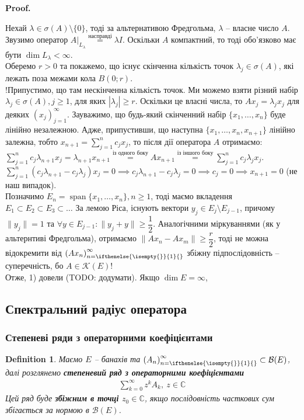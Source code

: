\documentclass[a4paper, 10pt]{article}
\makeatletter
\theoremstyle{theoremdd}
\theoremstyle{theoremdd}
\newtheorem{definition}[theorem]{Definition}
\theoremstyle{theoremdd}
\theoremstyle{theoremdd}
\theoremstyle{theoremdd}
\theoremstyle{theoremdd}
\theoremstyle{theoremdd}
\theoremstyle{theoremdd}
\newcommand{\sequence}[2][]{\left({#2}\right)_{n=\ifthenelse{\isempty{#1}}{1}{#1}}^{\infty}}
\renewenvironment{proof}[1][Proof.\\]{\par
\pushQED{\hfill \qed}%
\normalfont \topsep6\p@\@plus6\p@\relax
\trivlist
\item\relax
{\bfseries
#1\@addpunct{.}}\hspace\labelsep\ignorespaces
}{%
\popQED\endtrivlist\@endpefalse
}
\DeclareMathOperator{\linspan}{span}
\makeatother
\begin{document}
\begin{proof}
Нехай $\lambda \in \sigma(A) \setminus \{0\}$, тоді за альтернативою Фредгольма, $\lambda$ -- власне число $A$. Звузимо оператор $A|_{L_\lambda} \overset{\text{насправді}}{=} \lambda I$. Оскільки $A$ компактний, то тоді обо'язково має бути $\dim L_\lambda < \infty$.
\bigskip \\
Оберемо $r > 0$ та покажемо, що існує скінченна кількість точок $\lambda_j \in \sigma(A)$, які лежать поза межами кола $B(0;r)$.\\
!Припустимо, що там нескінченна кількість точок. Ми можемо взяти різний набір $\lambda_j \in \sigma(A), j \geq 1$, для яких $|\lambda_j| \geq r$. Оскільки це власні числа, то $Ax_j = \lambda_j x_j$ для деяких $(x_j)_{j=1}^\infty$. Зауважимо, що будь-який скінченний набір $\{x_1,\dots,x_n\}$ буде лінійно незалежною. Адже, припустивши, що наступна $\{x_1,\dots,x_n,x_{n+1}\}$ лінійно залежна, тобто $x_{n+1} = \displaystyle\sum_{j=1}^n c_j x_j$, то після дії оператора $A$ отримаємо:\\
$\displaystyle \sum_{j=1}^n c_j \lambda_{n+1} x_j = \lambda_{n+1} x_{n+1} \overset{\text{із одного боку}}{=} Ax_{n+1} \overset{\text{із іншого боку}}{=} \sum_{j=1}^n c_j \lambda_j x_j$.\\
$\displaystyle\sum_{j=1}^n (c_j \lambda_{n+1} - c_j \lambda_j) x_j = 0 \implies c_j \lambda_{n+1} - c_j \lambda_j = 0 \implies c_j = 0 \implies x_{n+1} = 0$ (не наш випадок).\\
Позначимо $E_n = \linspan\{x_1,\dots,x_n\}, n \geq 1$, тоді маємо вкладення $E_1 \subset E_2 \subset E_3 \subset \dots$ За лемою Ріса, існують вектори $y_j \in E_j \setminus E_{j-1}$, причому $\|y_j\|= 1$ та $\forall y \in E_{j-1}: \|y_j + y\| \geq \dfrac{1}{2}$. Аналогічними міркуваннями (як у альтернтиві Фредгольма), отримаємо $\|Ax_n - Ax_m\| \geq \dfrac{r}{2}$, тоді не можна відокремити від $\sequence{Ax_n}$ збіжну підпослідовність -- суперечність, бо $A \in \mathcal{K}(E)$!\\
Отже, 1) довели (TODO: додумати). Якщо $\dim E = \infty$, 
\end{proof}

\subsection{Спектральний радіус оператора}
\subsubsection{Степеневі ряди з операторними коефіцієнтами}
\begin{definition}
Маємо $E$ -- банахів та $\sequence{A_n} \subset \mathcal{B}(E)$,  далі розглянемо \textbf{степеневий ряд з операторними коефіцієнтами}
\begin{align*}
\sum_{k=0}^\infty z^k A_k,\ z \in \mathbb{C}
\end{align*}
Цей ряд буде \textbf{збіжним в точці $z_0 \in \mathbb{C}$}, якщо послідовність часткових сум збігається за нормою в $\mathcal{B}(E)$.
\end{definition}
\end{document}
